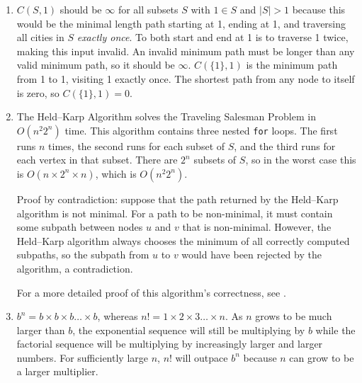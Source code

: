 \documentclass[a4paper, 10pt]{article}
\begin{document}
\begin{enumerate}
\begin{enumerate}

			\item $C(S, 1)$ should be $\infty$ for all subsets $S$ with $1 \in
				S$ and $|S| > 1$ because this would be the minimal length path
				starting at 1, ending at 1, and traversing all cities in $S$
				\textit{exactly once}. To both start and end at 1 is to traverse
				1 twice, making this input invalid. An invalid minimum path must
				be longer than any valid minimum path, so it should be $\infty$.
				$C(\{ 1 \}, 1)$ is the minimum path from 1 to 1, visiting 1
				exactly once. The shortest path from any node to itself is zero,
				so $C(\{ 1 \}, 1) = 0$.

			\item The Held--Karp Algorithm solves the Traveling Salesman Problem
				in $O(n^2 2^n)$ time. This algorithm contains three nested
				\texttt{for} loops. The first runs $n$ times, the second runs
				for each subset of $S$, and the third runs for each vertex in
				that subset. There are $2^n$ subsets of $S$, so in the worst
				case this is $O(n \times 2^n \times n)$, which is $O(n^2 2^n)$.

				Proof by contradiction: suppose that the path returned by the
				Held--Karp algorithm is not minimal. For a path to be
				non-minimal, it must contain some subpath between nodes $u$ and
				$v$ that is non-minimal. However, the Held--Karp algorithm
				always chooses the minimum of all correctly computed subpaths,
				so the subpath from $u$ to $v$ would have been rejected by the
				algorithm, a contradiction.

				For a more detailed proof of this algorithm's correctness, see
				\cite{held1962dynamic}.

			\item $b^n = b \times b \times b \dots \times b$, whereas $n! = 1
				\times 2 \times 3 \dots \times n$. As $n$ grows to be much
				larger than $b$, the exponential sequence will still be
				multiplying by $b$ while the factorial sequence will be
				multiplying by increasingly larger and larger numbers. For
				sufficiently large $n$, $n!$ will outpace $b^n$ because $n$ can
				grow to be a larger multiplier.
		\end{enumerate}
\end{enumerate}

\printbibliography
\end{document}
